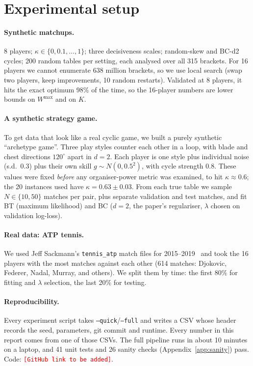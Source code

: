 \documentclass[11pt]{article}
\theoremstyle{remark}
\newcommand{\kap}{\kappa}
\newcommand{\Wmax}{W^{\max}}
\newcommand{\repourl}{\textcolor{red}{\texttt{[GitHub link to be added]}}}
\begin{document}
\section{Experimental setup}
\label{sec:setup}

\paragraph{Synthetic matchups.} 8 players; $\kap\in\{0,0.1,\dots,1\}$; three decisiveness scales; random-skew and BC-d2
cycles; 200 random tables per setting, each analysed over all 315 brackets. For 16 players we cannot enumerate 638 million
brackets, so we use local search (swap two players, keep improvements, 10 random restarts). Validated at 8 players, it hits
the exact optimum 98\% of the time, so the 16-player numbers are lower bounds on $\Wmax$ and on $K$.

\paragraph{A synthetic strategy game.} To get data that look like a real cyclic game, we built a purely synthetic ``archetype
game''. Three play styles counter each other in a loop, with blade and chest directions $120^\circ$ apart in $d=2$. Each player
is one style plus individual noise (s.d.\ 0.3) plus their own skill $g\sim N(0,0.5^2)$, with cycle strength 0.8. These values
were fixed \emph{before} any organiser-power metric was examined, to hit $\kap\approx0.6$; the 20 instances used have
$\kap=0.63\pm0.03$. From each true table we sample $N\in\{10,50\}$ matches per pair, plus separate validation and test
matches, and fit BT (maximum likelihood) and BC ($d=2$, the paper's regulariser, $\lambda$ chosen on validation log-loss).

\paragraph{Real data: ATP tennis.} We used Jeff Sackmann's \texttt{tennis\_atp} match files for 2015--2019~\cite{sackmann2024tennis}
and took the 16 players with the most matches against each other (614 matches: Djokovic, Federer, Nadal, Murray, and others).
We split them by time: the first 80\% for fitting and $\lambda$ selection, the last 20\% for testing.

\paragraph{Reproducibility.} Every experiment script takes \texttt{--quick}/\texttt{--full} and writes a CSV whose header
records the seed, parameters, git commit and runtime. Every number in this report comes from one of those CSVs. The full
pipeline runs in about 10 minutes on a laptop, and 41 unit tests and 26 sanity checks (Appendix~\ref{app:sanity}) pass. Code:
\repourl.
\end{document}
